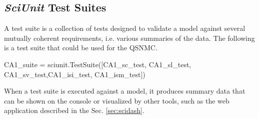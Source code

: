 \documentclass[11pt,letterpaper]{article}
\begin{document}
\subsection{\textit{SciUnit} Test Suites}
A test suite is a collection of tests designed to validate a model against several mutually coherent requirements, i.e. various summaries of the data.  The following is a test suite that could be used for the QSNMC.  
\begin{python}
CA1_suite = sciunit.TestSuite([CA1_sc_test, CA1_sl_test, CA1_sv_test,CA1_isi_test, CA1_ism_test])
\end{python}
When a test suite is executed against a model, it produces summary data that can be shown on the console or visualized by other tools, such as the web application described in the Sec. \ref{sec:scidash}.
\end{document}
